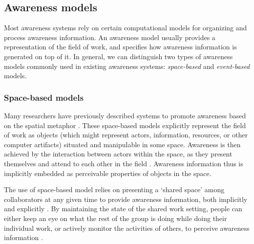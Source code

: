 \subsection{Awareness models} %
\label{sub:awareness_models}
Most awareness systems rely on certain computational models for organizing and process awareness information. An awareness model usually provides a representation of the field of work, and specifies how awareness information is generated on top of it. In general, we can distinguish two types of awareness models commonly used in existing awareness systems: \emph{space-based} and \emph{event-based} models. 
\subsubsection{Space-based models} %
\label{ssub:space_based_model}
Many researchers have previously described systems to promote awareness based on the spatial metaphor \cite{Benford1993,Rodden1996,Sandor1997,simone2002a}. These space-based models explicitly represent the field of work as objects (which might represent actors, information, resources, or other computer artifacts) situated and manipulable in some space. Awareness is then achieved by the interaction between actors within the space, as they present themselves and attend to each other in the field \cite{Rodden1996}. Awareness information thus is implicitly embedded as perceivable properties of objects in the space.  

The use of space-based model relies on presenting a `shared space' among collaborators at any given time to provide awareness information, both implicitly and explicitly \cite{dourish1992awareness}. By maintaining the state of the shared work setting, people can either keep an eye on what the rest of the group is doing while doing their individual work, or actively monitor the activities of others, to perceive awareness information \cite{simone2002a}. 

